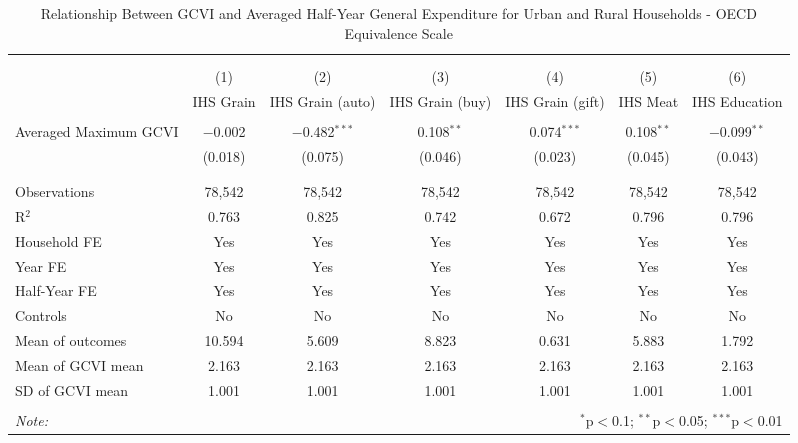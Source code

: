 
\begin{table}[!htbp] \centering 
  \caption{Relationship Between GCVI and Averaged Half-Year General Expenditure for Urban and Rural Households - OECD Equivalence Scale} 
  \label{gcvi_table_2.tex} 
\normalsize 
\begin{tabular}{@{\extracolsep{5pt}}lcccccc} 
\\[-1.8ex]\hline 
\hline \\[-1.8ex] 
\\[-1.8ex] & (1) & (2) & (3) & (4) & (5) & (6)\\ 
 & IHS Grain & IHS Grain (auto) & IHS Grain (buy) & IHS Grain (gift) & IHS Meat & IHS Education \\ 
\hline \\[-1.8ex] 
 Averaged Maximum GCVI & $-$0.002 & $-$0.482$^{***}$ & 0.108$^{**}$ & 0.074$^{***}$ & 0.108$^{**}$ & $-$0.099$^{**}$ \\ 
  & (0.018) & (0.075) & (0.046) & (0.023) & (0.045) & (0.043) \\ 
  & & & & & & \\ 
\hline \\[-1.8ex] 
Observations & 78,542 & 78,542 & 78,542 & 78,542 & 78,542 & 78,542 \\ 
R$^{2}$ & 0.763 & 0.825 & 0.742 & 0.672 & 0.796 & 0.796 \\ 
Household FE & Yes & Yes & Yes & Yes & Yes & Yes \\ 
Year FE & Yes & Yes & Yes & Yes & Yes & Yes \\ 
Half-Year FE & Yes & Yes & Yes & Yes & Yes & Yes \\ 
Controls & No & No & No & No & No & No \\ 
Mean of outcomes & 10.594 & 5.609 & 8.823 & 0.631 & 5.883 & 1.792 \\ 
Mean of GCVI mean & 2.163 & 2.163 & 2.163 & 2.163 & 2.163 & 2.163 \\ 
SD of GCVI mean & 1.001 & 1.001 & 1.001 & 1.001 & 1.001 & 1.001 \\ 
\hline \\[-1.8ex] 
\textit{Note:}  & \multicolumn{6}{r}{$^{*}$p$<$0.1; $^{**}$p$<$0.05; $^{***}$p$<$0.01} \\ 
\end{tabular} 
\end{table} 
